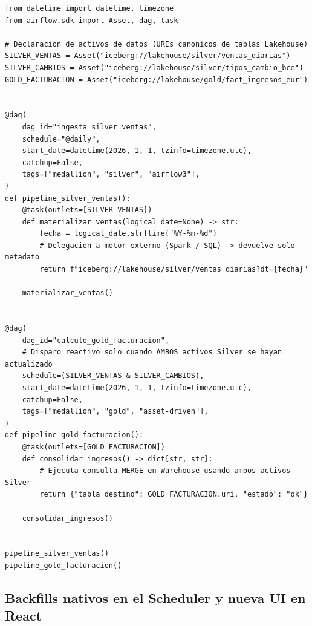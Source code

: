 \begin{lstlisting}[style=python, caption={Definición moderna en Airflow 3.0+ usando \texttt{airflow.sdk} y programación reactiva orientada a \texttt{Asset} con operador lógico \texttt{\&}.}, label={lst:airflow3-assets-sdk}]
from datetime import datetime, timezone
from airflow.sdk import Asset, dag, task

# Declaracion de activos de datos (URIs canonicos de tablas Lakehouse)
SILVER_VENTAS = Asset("iceberg://lakehouse/silver/ventas_diarias")
SILVER_CAMBIOS = Asset("iceberg://lakehouse/silver/tipos_cambio_bce")
GOLD_FACTURACION = Asset("iceberg://lakehouse/gold/fact_ingresos_eur")


@dag(
    dag_id="ingesta_silver_ventas",
    schedule="@daily",
    start_date=datetime(2026, 1, 1, tzinfo=timezone.utc),
    catchup=False,
    tags=["medallion", "silver", "airflow3"],
)
def pipeline_silver_ventas():
    @task(outlets=[SILVER_VENTAS])
    def materializar_ventas(logical_date=None) -> str:
        fecha = logical_date.strftime("%Y-%m-%d")
        # Delegacion a motor externo (Spark / SQL) -> devuelve solo metadato
        return f"iceberg://lakehouse/silver/ventas_diarias?dt={fecha}"

    materializar_ventas()


@dag(
    dag_id="calculo_gold_facturacion",
    # Disparo reactivo solo cuando AMBOS activos Silver se hayan actualizado
    schedule=(SILVER_VENTAS & SILVER_CAMBIOS),
    start_date=datetime(2026, 1, 1, tzinfo=timezone.utc),
    catchup=False,
    tags=["medallion", "gold", "asset-driven"],
)
def pipeline_gold_facturacion():
    @task(outlets=[GOLD_FACTURACION])
    def consolidar_ingresos() -> dict[str, str]:
        # Ejecuta consulta MERGE en Warehouse usando ambos activos Silver
        return {"tabla_destino": GOLD_FACTURACION.uri, "estado": "ok"}

    consolidar_ingresos()


pipeline_silver_ventas()
pipeline_gold_facturacion()
\end{lstlisting}

\subsection{Backfills nativos en el Scheduler y nueva UI en React}\label{subsec:backfills-ui-react}


